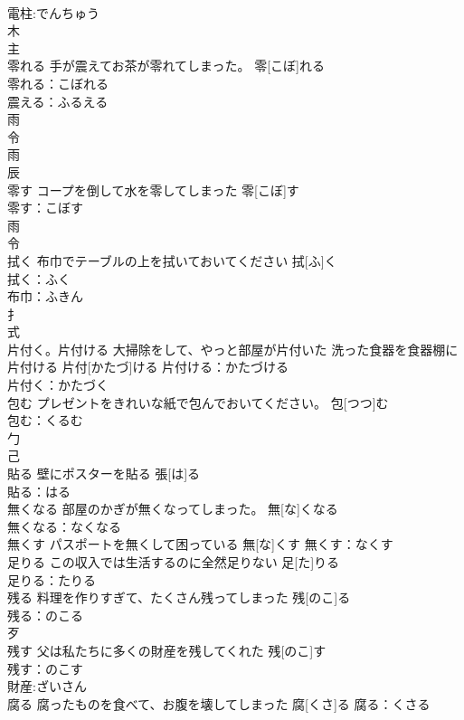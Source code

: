 \documentclass[8pt]{extreport}
\begin{document}
\begin{CJK}{UTF8}{min}
\\	電柱:でんちゅう
\\	木 
\\	主 
\\	零れる	手が震えてお茶が零れてしまった。	零[こぼ]れる	
\\	零れる：こぼれる
\\	震える：ふるえる
\\	雨 
\\	令 
\\	雨 
\\	辰 
\\	零す	コープを倒して水を零してしまった	零[こぼ]す	
\\	零す：こぼす
\\	雨 
\\	令 
\\	拭く	布巾でテーブルの上を拭いておいてください	拭[ふ]く	
\\	拭く：ふく
\\	布巾：ふきん
\\	扌 
\\	式 
\\	片付く。片付ける	大掃除をして、やっと部屋が片付いた 洗った食器を食器棚に片付ける	片付[かたづ]ける			片付ける：かたづける
\\	片付く：かたづく
\\	包む	プレゼントをきれいな紙で包んでおいてください。	包[つつ]む	
\\	包む：くるむ
\\	勹 
\\	己 
\\	貼る	壁にポスターを貼る	張[は]る	
\\	貼る：はる
\\	無くなる	部屋のかぎが無くなってしまった。	無[な]くなる	
\\	無くなる：なくなる
\\	無くす	パスポートを無くして困っている	無[な]くす			無くす：なくす
\\	足りる	この収入では生活するのに全然足りない	足[た]りる	
\\	足りる：たりる
\\	残る	料理を作りすぎて、たくさん残ってしまった	残[のこ]る	
\\	残る：のこる
\\	歹 
\\	残す	父は私たちに多くの財産を残してくれた	残[のこ]す	
\\	残す：のこす
\\	財産:ざいさん
\\	腐る	腐ったものを食べて、お腹を壊してしまった	腐[くさ]る			腐る：くさる

\end{CJK}
\end{document}
